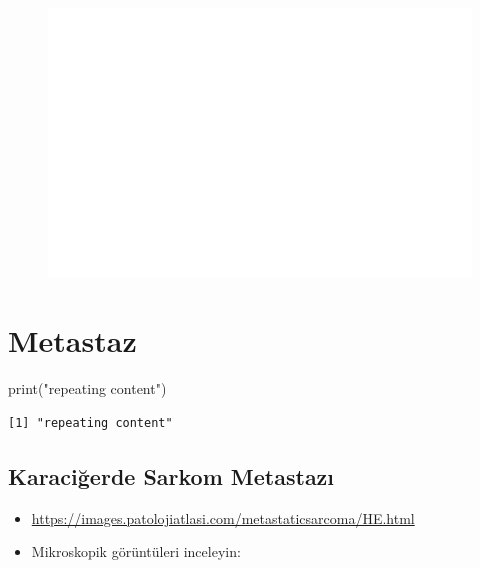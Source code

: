 \documentclass[
  letterpaper,
  DIV=11,
  numbers=noendperiod]{scrreprt}
\newenvironment{Shaded}{}{}
\newcommand{\FunctionTok}[1]{\textcolor[rgb]{0.02,0.16,0.49}{#1}}
\newcommand{\NormalTok}[1]{#1}
\newcommand{\StringTok}[1]{\textcolor[rgb]{0.25,0.44,0.63}{#1}}
\begin{document}
\begin{figure}[H]

{\centering

\href{https://images.patolojiatlasi.com/ectopic-adrenal/HE.html}{\includegraphics{./heterotopi_files/figure-pdf/unnamed-chunk-5-1.pdf}}

}

\end{figure}

\hypertarget{metastaz}{%
\chapter{Metastaz}\label{metastaz}}

\begin{Shaded}
\begin{Highlighting}[]
\FunctionTok{print}\NormalTok{(}\StringTok{"repeating content"}\NormalTok{)}
\end{Highlighting}
\end{Shaded}

\begin{verbatim}
[1] "repeating content"
\end{verbatim}

\hypertarget{karaciux11ferde-sarkom-metastazux131}{%
\section{Karaciğerde Sarkom
Metastazı}\label{karaciux11ferde-sarkom-metastazux131}}

\begin{itemize}
\item
  \url{https://images.patolojiatlasi.com/metastaticsarcoma/HE.html}
\item
  Mikroskopik görüntüleri inceleyin:
\end{itemize}
\end{document}
